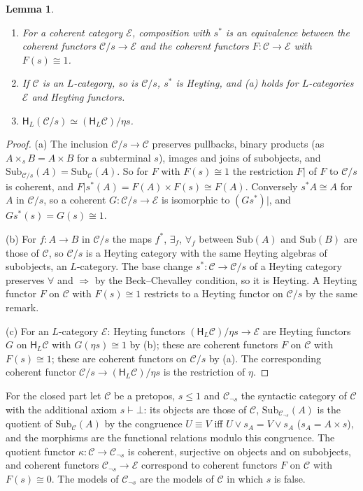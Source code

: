 \documentclass[11pt]{amsart}
\newtheorem{lem}[thm]{Lemma}
\theoremstyle{definition}
\newcommand{\Sub}{\mathrm{Sub}}
\newcommand{\HH}{\mathsf H}
\newcommand{\cC}{\mathcal C}
\newcommand{\cE}{\mathcal E}
\begin{document}
\begin{lem}\label{lem:slice}
\begin{enumerate}
\item[(a)] For a coherent category $\cE$, composition with $s^*$ is an
equivalence between the coherent functors $\cC/s\to\cE$ and the
coherent functors $F\colon\cC\to\cE$ with $F(s)\cong1$.
\item[(b)] If $\cC$ is an $L$-category, so is $\cC/s$, $s^*$ is
Heyting, and (a) holds for $L$-categories $\cE$ and Heyting functors.
\item[(c)] $\HH_L(\cC/s)\simeq(\HH_L\cC)/\eta s$.
\end{enumerate}
\end{lem}
\begin{proof}
(a) The inclusion $\cC/s\to\cC$ preserves pullbacks, binary products
(as $A\times_sB=A\times B$ for a subterminal $s$), images and joins of
subobjects, and $\Sub_{\cC/s}(A)=\Sub_\cC(A)$. So for $F$ with
$F(s)\cong1$ the restriction $F|$ of $F$ to $\cC/s$ is coherent, and
$F|s^*(A)=F(A)\times F(s)\cong F(A)$. Conversely $s^*A\cong A$ for $A$
in $\cC/s$, so a coherent $G\colon\cC/s\to\cE$ is isomorphic to
$(Gs^*)|$, and $Gs^*(s)=G(s)\cong1$.

(b) For $f\colon A\to B$ in $\cC/s$ the maps $f^*$, $\exists_f$,
$\forall_f$ between $\Sub(A)$ and $\Sub(B)$ are those of $\cC$, so
$\cC/s$ is a Heyting category with the same Heyting algebras of
subobjects, an $L$-category. The base change $s^*\colon\cC\to\cC/s$ of a Heyting category
preserves $\forall$ and $\Rightarrow$ by the Beck--Chevalley
condition, so it is Heyting. A Heyting functor $F$ on $\cC$ with $F(s)
\cong1$ restricts to a Heyting functor on $\cC/s$ by the same remark.

(c) For an $L$-category $\cE$: Heyting functors $(\HH_L\cC)/\eta s\to
\cE$ are Heyting functors $G$ on $\HH_L\cC$ with $G(\eta s)\cong1$ by
(b); these are coherent functors $F$ on $\cC$ with $F(s)\cong1$; these
are coherent functors on $\cC/s$ by (a). The corresponding coherent
functor $\cC/s\to(\HH_L\cC)/\eta s$ is the restriction of $\eta$.
\end{proof}

For the closed part let $\cC$ be a pretopos, $s\le1$ and
$\cC_{\neg s}$ the syntactic category of $\cC$ with the additional
axiom $s\vdash\bot$: its objects are those of $\cC$, $\Sub_{\cC_{\neg
s}}(A)$ is the quotient of $\Sub_\cC(A)$ by the congruence $U\equiv V$
iff $U\vee s_A=V\vee s_A$ ($s_A=A\times s$), and the morphisms are the
functional relations modulo this congruence. The quotient functor
$\kappa\colon\cC\to\cC_{\neg s}$ is coherent, surjective on objects and
on subobjects, and coherent functors $\cC_{\neg s}\to\cE$ correspond to
coherent functors $F$ on $\cC$ with $F(s)\cong0$. The models of
$\cC_{\neg s}$ are the models of $\cC$ in which $s$ is false.
\end{document}
